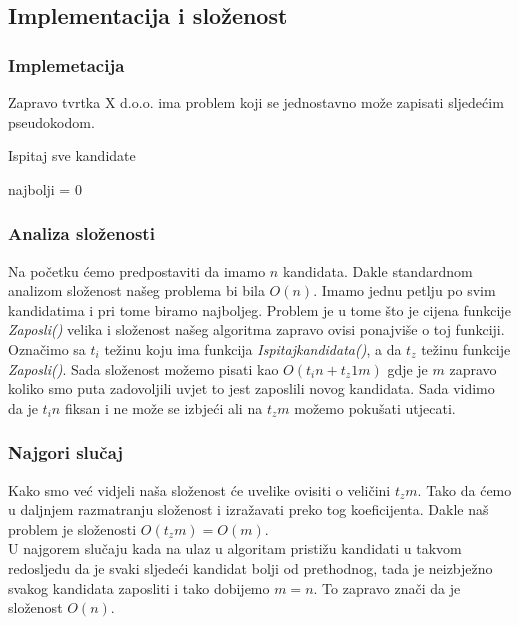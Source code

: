 \documentclass[10pt,a4paper]{article}
\begin{document}
\subsection{Implementacija i složenost}
\subsubsection{Implemetacija} 
Zapravo tvrtka X d.o.o. ima problem koji se jednostavno može zapisati sljedećim pseudokodom.

\begin{algorithm}[H]
\caption{Ispitaj sve kandidate}
najbolji = 0\;
\end{algorithm}

\subsubsection{Analiza složenosti}
Na početku ćemo predpostaviti da imamo $n$ kandidata. Dakle standardnom analizom složenost našeg 
problema bi bila $O(n)$. Imamo jednu petlju po svim kandidatima i pri tome biramo najboljeg. 
Problem je u tome što je cijena funkcije \textit{Zaposli()} velika i složenost našeg algoritma 
zapravo ovisi ponajviše o toj funkciji.\\
Označimo sa $t_i$ težinu koju ima funkcija \textit{Ispitajkandidata()}, a da $t_z$ težinu funkcije 
\textit{Zaposli()}. Sada složenost možemo pisati kao $O(t_in + t_z1m)$ gdje je $m$ zapravo koliko 
smo puta zadovoljili uvjet to jest zaposlili novog kandidata. Sada vidimo da je $t_in$ fiksan i ne 
može se izbjeći ali na $t_zm$ možemo pokušati utjecati.
\subsubsection*{Najgori slučaj}
Kako smo već vidjeli naša složenost će uvelike ovisiti o veličini $t_zm$. 
Tako da ćemo u daljnjem razmatranju složenost i izražavati preko tog koeficijenta. Dakle naš problem 
je složenosti $O(t_zm)=O(m)$. \\
U najgorem slučaju kada na ulaz u algoritam pristižu kandidati u takvom redosljedu da je svaki sljedeći 
kandidat bolji od prethodnog, tada je neizbježno svakog kandidata zaposliti i tako dobijemo $m=n$. 
To zapravo znači da je složenost $O(n)$.
\end{document}
